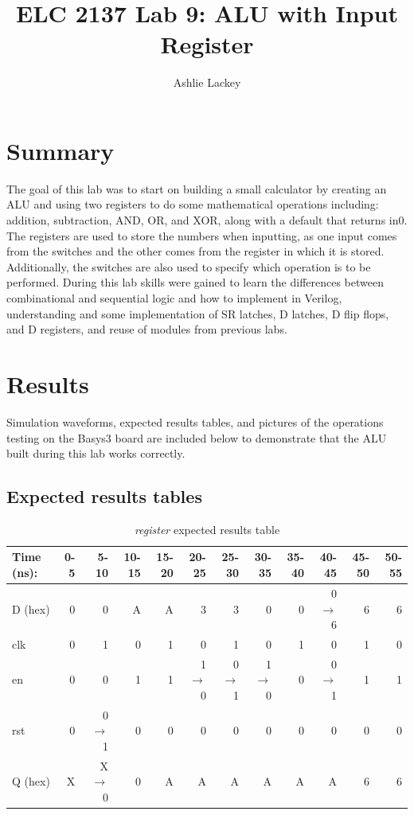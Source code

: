 \documentclass[11pt]{article}
\begin{document}
\title{ELC 2137 Lab 9: ALU with Input Register}
\author{Ashlie Lackey}

\maketitle


\section*{Summary}

The goal of this lab was to start on building a small calculator by creating an ALU and using two registers to do some mathematical operations including: addition, subtraction, AND, OR, and XOR, along with a default that returns in0. The registers are used to store the numbers when inputting, as one input comes from the switches and the other comes from the register in which it is stored. Additionally, the switches are also used to specify which operation is to be performed. During this lab skills were gained to learn the differences between combinational and sequential logic and how to implement in Verilog, understanding and some implementation of SR latches, D latches, D flip flops, and D registers, and reuse of modules from previous labs. 

\section*{Results}

Simulation waveforms, expected results tables, and pictures of the operations testing on the Basys3 board are included below to demonstrate that the ALU built during this lab works correctly.

\subsection*{Expected results tables}
\begin{table}[ht]\centering
	\caption{\textit{register} expected results table}
	\label{ALU:tbl:register_ERT}\medskip
	\begin{tabular}{l|rrrrrrrrrrr}
		Time (ns): & 0-5 & 5-10 & 10-15 & 15-20 & 20-25 & 25-30 & 30-35 & 35-40& 40-45 & 45-50 & 50-55 \\
		\midrule
		D (hex) & 0 & 0     & A & A & 3         & 3       & 0           & 0 & 0$\to$6 & 6 & 6 \\
		clk     & 0 & 1     & 0 & 1 & 0         & 1       & 0           & 1 & 0   & 1 & 0 \\
		en    & 0 & 0       & 1 & 1 & 1$\to$0 & 0$\to$1 & 1$\to$0 & 0 & 0$\to$1& 1 & 1 \\
		rst   & 0 & 0$\to$1 & 0 & 0 & 0          & 0     & 0       & 0 & 0  & 0 & 0 \\
		\midrule
		Q (hex) & X & X$\to$0 & 0 & A & A & A & A & A & A & 6 & 6 \\
		\bottomrule
	\end{tabular}
\end{table}
\end{document}
